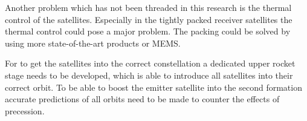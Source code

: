 Another problem which has not been threaded in this research is the thermal control of the satellites. Especially in the tightly packed receiver satellites the thermal control could pose a major problem. The packing could be solved by using more state-of-the-art products or \ac{MEMS}.

For to get the satellites into the correct constellation a dedicated upper rocket stage needs to be developed, which is able to introduce all satellites into their correct orbit. To be able to boost the emitter satellite into the second formation accurate predictions of all orbits need to be made to counter the effects of precession.

